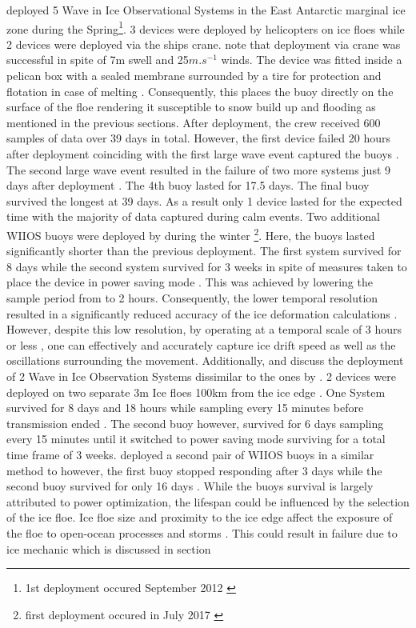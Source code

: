 \textcite{kohout2015device} deployed 5 Wave in Ice Observational Systems in the East Antarctic marginal ice zone during the Spring\footnote{1st deployment occured September 2012 \cite{kohout2015device}}. 3 devices were deployed by helicopters on ice floes while 2 devices were deployed via the ships crane. \textcite{kohout2015device}
note that deployment via crane was successful in spite of 7m swell and 25$m.s^{-1}$ winds. The device was fitted inside a pelican box with a sealed membrane surrounded by a tire for protection and flotation in case of melting \cite{kohout2015device}. Consequently, this places the buoy directly on the surface of the floe rendering it susceptible to snow build up and flooding as mentioned in the previous sections.  After deployment, the crew received 600 samples of data over 39 days in total. However, the first device failed 20 hours after deployment coinciding with the first large wave event captured the buoys \cite{kohout2015device}. The second large wave event resulted in the failure of two more systems just 9 days after deployment \cite{kohout2015device}. The 4th buoy lasted for 17.5 days. The final buoy survived the longest at 39 days. As a result only 1 device lasted for the expected time with the majority of data captured during calm events. Two additional WIIOS buoys were deployed by \textcite{alberello2019drift} during the winter \footnote{first deployment occured in July 2017 \cite{alberello2019drift}}. Here, the buoys lasted significantly shorter than the previous deployment. The first system survived for 8 days while the second system survived for 3 weeks in spite of measures taken to place the device in power saving mode \cite{alberello2019drift}. This was achieved by lowering the sample period from to 2 hours. Consequently, the lower temporal resolution resulted in a significantly reduced accuracy of the ice deformation calculations \cite{alberello2019drift}. However, despite this low resolution, by operating at a temporal scale of 3 hours or less \cite{alberello2019drift}, one can effectively and accurately capture ice drift speed as well as the oscillations surrounding the movement. Additionally, \textcite{vichi2019effects} and \cite{albarello2020drift} discuss the deployment of 2 Wave in Ice Observation Systems dissimilar to the ones by \cite{kohout2015device}. 2 devices were deployed on two separate 3m Ice floes 100km from the ice edge \cite{albarello2020drift}. One System survived for 8 days and 18 hours while sampling every 15 minutes before transmission ended \cite{albarello2020drift}. The second buoy however, survived for 6 days sampling every 15 minutes until it switched to power saving mode surviving for a total time frame of 3 weeks. \textcite{vichi2019effects} deployed a second pair of WIIOS buoys in a similar method to \cite{alberello2019drift} however, the first buoy stopped responding after 3 days while the second buoy survived for only 16 days \cite{vichi2019effects}. While the buoys survival is largely attributed to power optimization, the lifespan could be influenced by the selection of the ice floe. Ice floe size and proximity to the ice edge affect the exposure of the floe to open-ocean processes and storms \cite{vichi2019effects}. This could result in failure due to ice mechanic which is discussed in section 
